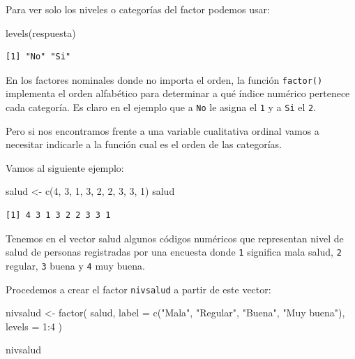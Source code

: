 \documentclass[
  spanish,
  a4paper,
]{scrbook}
\newenvironment{Shaded}{\begin{snugshade}}{\end{snugshade}}
\newcommand{\AttributeTok}[1]{\textcolor[rgb]{0.40,0.45,0.13}{#1}}
\newcommand{\DecValTok}[1]{\textcolor[rgb]{0.68,0.00,0.00}{#1}}
\newcommand{\FunctionTok}[1]{\textcolor[rgb]{0.28,0.35,0.67}{#1}}
\newcommand{\NormalTok}[1]{\textcolor[rgb]{0.00,0.23,0.31}{#1}}
\newcommand{\OtherTok}[1]{\textcolor[rgb]{0.00,0.23,0.31}{#1}}
\newcommand{\SpecialCharTok}[1]{\textcolor[rgb]{0.37,0.37,0.37}{#1}}
\newcommand{\StringTok}[1]{\textcolor[rgb]{0.13,0.47,0.30}{#1}}
\begin{document}
Para ver solo los niveles o categorías del factor podemos usar:

\begin{Shaded}
\begin{Highlighting}[]
\FunctionTok{levels}\NormalTok{(respuesta)}
\end{Highlighting}
\end{Shaded}

\begin{verbatim}
[1] "No" "Si"
\end{verbatim}

En los factores nominales donde no importa el orden, la función
\texttt{factor()} implementa el orden alfabético para determinar a qué
índice numérico pertenece cada categoría. Es claro en el ejemplo que a
\texttt{No} le asigna el \texttt{1} y a \texttt{Si} el \texttt{2}.

Pero si nos encontramos frente a una variable cualitativa ordinal vamos
a necesitar indicarle a la función cual es el orden de las categorías.

Vamos al siguiente ejemplo:

\begin{Shaded}
\begin{Highlighting}[]
\NormalTok{salud }\OtherTok{\textless{}{-}} \FunctionTok{c}\NormalTok{(}\DecValTok{4}\NormalTok{, }\DecValTok{3}\NormalTok{, }\DecValTok{1}\NormalTok{, }\DecValTok{3}\NormalTok{, }\DecValTok{2}\NormalTok{, }\DecValTok{2}\NormalTok{, }\DecValTok{3}\NormalTok{, }\DecValTok{3}\NormalTok{, }\DecValTok{1}\NormalTok{)}
\NormalTok{salud}
\end{Highlighting}
\end{Shaded}

\begin{verbatim}
[1] 4 3 1 3 2 2 3 3 1
\end{verbatim}

Tenemos en el vector salud algunos códigos numéricos que representan
nivel de salud de personas registradas por una encuesta donde \texttt{1}
significa mala salud, \texttt{2} regular, \texttt{3} buena y \texttt{4}
muy buena.

Procedemos a crear el factor \texttt{nivsalud} a partir de este vector:

\begin{Shaded}
\begin{Highlighting}[]
\NormalTok{nivsalud }\OtherTok{\textless{}{-}} \FunctionTok{factor}\NormalTok{(}
\NormalTok{  salud,}
  \AttributeTok{label =} \FunctionTok{c}\NormalTok{(}\StringTok{"Mala"}\NormalTok{, }\StringTok{"Regular"}\NormalTok{, }\StringTok{"Buena"}\NormalTok{, }\StringTok{"Muy buena"}\NormalTok{),}
  \AttributeTok{levels =} \DecValTok{1}\SpecialCharTok{:}\DecValTok{4}
\NormalTok{)}

\NormalTok{nivsalud}
\end{Highlighting}
\end{Shaded}
\end{document}
